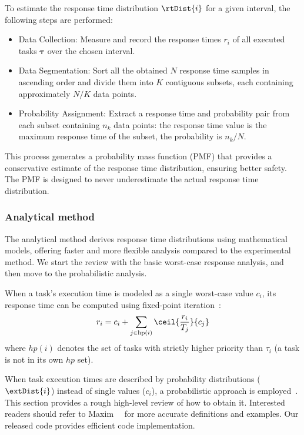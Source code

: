     To estimate the response time distribution $\rtDist{i}$ for a given interval, the following steps are performed:
    \begin{itemize}
        \item Data Collection: Measure and record the response times $r_i$ of all executed tasks $\boldsymbol{\tau}$ over the chosen interval.
        \item Data Segmentation: Sort all the obtained $N$ response time samples in ascending order and divide them into $K$ contiguous subsets, each containing approximately $N/K$ data points.
        \item Probability Assignment: Extract a response time and probability pair from each subset containing $n_k$ data points: the response time value is the maximum response time of the subset, the probability is $n_k / N$.
    \end{itemize}
    This process generates a probability mass function (PMF) that provides a conservative estimate of the response time distribution, ensuring better safety.
    The PMF is designed to never underestimate the actual response time distribution.


	\subsubsection{Analytical method}
    The analytical method derives response time distributions using mathematical models, offering faster and more flexible analysis compared to the experimental method.
    We start the review with the basic worst-case response analysis, and then move to the probabilistic analysis.


	When a task’s execution time is modeled as a single worst-case value $c_i$, its response time can be computed using fixed-point iteration~\cite{Joseph1986FindingRT}:
	\begin{equation}
		r_i = c_i +\sum_{j \in \text{hp}(i)} \ceil{\frac{r_i}{T_j}}{c_j}
        \label{eq: rta_scalar}
	\end{equation}
    where $hp(i)$ denotes the set of tasks with strictly higher priority than $\tau_i$ (a task is not in its own $hp$ set).

    When task execution times are described by probability distributions ($\extDist{i}$) instead of single values ($c_i$), a probabilistic approach is employed~\cite{Maxim2013ResponseTA, Maxim2022ProbabilisticA}.
    This section provides a rough high-level review of how to obtain it.
    Interested readers should refer to Maxim~\etal~\cite{Maxim2022ProbabilisticA} for more accurate definitions and examples.
    Our released code provides efficient code implementation.

